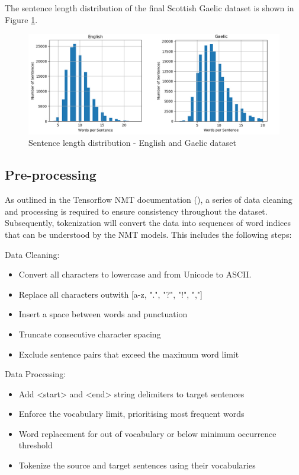 The sentence length distribution of the final Scottish Gaelic dataset is shown in Figure \ref{fig:sentence_length-gaelic}.
\begin{figure}[ht!]
\centering
\includegraphics[width=1\textwidth]{media/methodology/s_length-2-en_gd.jpg}
\captionsetup{justification=centering}
\caption[Scottish Gaelic dataset sentence length distribution]{Sentence length distribution - English and Gaelic dataset}
\label{fig:sentence_length-gaelic}
\end{figure}


\subsection{Pre-processing}

As outlined in the Tensorflow \acrshort{NMT} documentation (\cite{tensorflow_preprocess_2020}), a series of data cleaning and processing is required to ensure consistency throughout the dataset. Subsequently, tokenization will convert the data into sequences of word indices that can be understood by the \acrshort{NMT} models. This includes the following steps:

Data Cleaning:
\begin{itemize}
    \item Convert all characters to lowercase and from Unicode to ASCII. %
    \item Replace all characters outwith [a-z, ".", "?", "!", ","]
    \item Insert a space between words and punctuation
    \item Truncate consecutive character spacing
    \item Exclude sentence pairs that exceed the maximum word limit
\end{itemize}

Data Processing:
\begin{itemize}
    \item Add <start> and <end> string delimiters to target sentences
    \item Enforce the vocabulary limit, prioritising most frequent words
    \item Word replacement for out of vocabulary or below minimum occurrence threshold
    \item Tokenize the source and target sentences using their vocabularies
\end{itemize}

